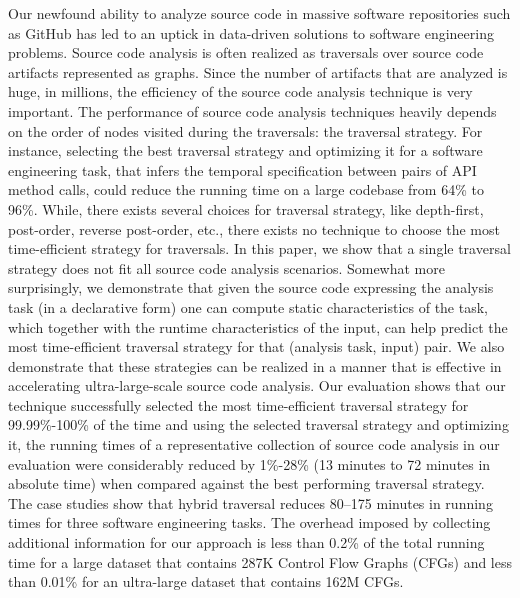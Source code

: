 Our newfound ability to analyze source code in massive software
repositories such as GitHub has led to an uptick in data-driven
solutions to software engineering problems. Source code analysis is
often realized as traversals over source code artifacts represented as
graphs. Since the number of artifacts that are analyzed is huge, in
millions, the efficiency of the source code analysis technique is very
important. The performance of source code analysis techniques heavily
depends on the order of nodes visited during the traversals: the
traversal strategy. For instance, selecting the best traversal strategy and optimizing it for a software engineering task, that infers the temporal specification between pairs of API method calls, could reduce the running time on a large codebase from 64\% to 96\%. 
While, there exists several choices for traversal strategy, like depth-first, post-order, reverse post-order, etc., there exists no technique to choose the most time-efficient strategy for traversals. In this paper, we show that a single traversal strategy does not fit all source code analysis scenarios. Somewhat more
surprisingly, we demonstrate that given the source code expressing the
analysis task (in a declarative form) one can compute static
characteristics of the task, which together with the runtime
characteristics of the input, can help predict the most time-efficient
traversal strategy for that (analysis task, input) pair. We also
demonstrate that these strategies can be realized in a manner that is
effective in accelerating ultra-large-scale source code analysis. Our
evaluation shows that our technique successfully selected the most
time-efficient traversal strategy for 99.99\%-100\% of the time and
using the selected traversal strategy and optimizing it, the running times of a
representative collection of source code analysis in our evaluation
were considerably reduced by 1\%-28\% (13 minutes to 72 minutes in absolute time) when compared against the best performing traversal strategy. The case studies show that hybrid traversal reduces 80--175 minutes in running times for three software engineering tasks. The overhead imposed by
collecting additional information for our approach is less than
0.2\% of the total running time for a large dataset that contains 287K
Control Flow Graphs (CFGs) and less than 0.01\% for an ultra-large
dataset that contains 162M CFGs.